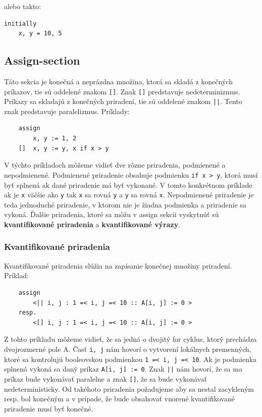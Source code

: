 alebo takto:

\begin{lstlisting}
initially
	x, y = 10, 5
\end{lstlisting}
\subsection{Assign-section}
Táto sekcia je konečná a neprázdna množina, ktorá sa skladá z konečných príkazov, tie sú oddelené znakom \texttt{[]}. 
Znak \texttt{[]} predstavuje nedeterminizmus. Príkazy sa skladajú z konečných priradení, tie sú oddelené znakom \texttt{||}.
Tento znak predstavuje paralelizmus. Príklady:
\begin{lstlisting}
	assign
		x, y := 1, 2 
	[]	x, y := y, x if x > y	
\end{lstlisting}

V týchto príkladoch môžeme vidieť dve rôzne priradenia, podmienené a nepodmienené. 
Podmienené priradenie obsahuje podmienku \texttt{if x > y}, ktorá musí byť splnená ak dané priradenie má byť vykonané.
V tomto konkrétnom príklade ak je \texttt{x} väčšie ako \texttt{y} tak \texttt{x} sa rovná \texttt{y} a \texttt{y} sa rovná \texttt{x}.
Nepodmienené priradenie je teda jednoduché priradenie, v ktorom nie je žiadna podmienka a priradenie sa vykoná.
Ďalšie priradenia, ktoré sa môžu v assign sekcii vyskytnúť sú \textbf{kvantifikované priradenia} a \textbf{kvantifikované výrazy}.

\subsubsection{Kvantifikované priradenia}

Kvantifikované priradenia slúžia na zapísanie konečnej množiny priradení. Príklad:
\begin{lstlisting}
	assign
		<|| i, j : 1 =< i, j =< 10 :: A[i, j] := 0 >
	resp.
		<[] i, j : 1 =< i, j =< 10 :: A[i, j] := 0 >
\end{lstlisting}
Z tohto príkladu môžeme vidieť, že sa jedná o dvojitý for cyklus, ktorý prechádza dvojrozmerné pole A. 
Časť \texttt{i, j} nám hovorí o vytvorení lokálnych premenných, ktoré sa kontrolujú booleovskou podmienkou \texttt{1 =< i, j =< 10}.
Ak je podmienka splnená vykoná sa daný príkaz \texttt{A[i, j] := 0}. 
Znak \texttt{||} nám hovorí, že sa ma príkaz bude vykonávať paralelne a znak \texttt{[]}, že sa bude vykonávať nedeterministicky.
Od takéhoto priradenia požadujeme aby sa nestal zacykleným resp. bol konečným 
a v prípade, že bude obsahovať vnorené kvantifikované priradenie musí byť konečné.

